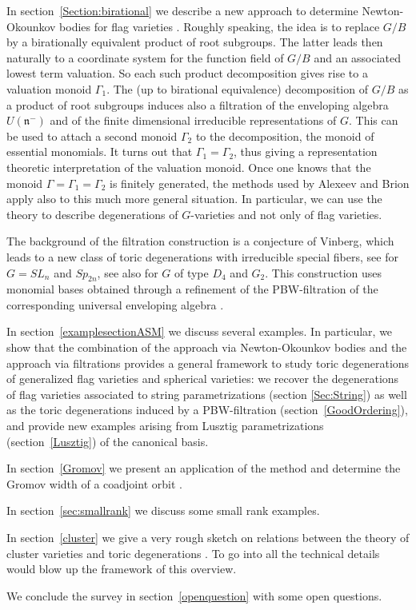 \documentclass{emsprocart}
\theoremstyle{definition}
\begin{document}
In section~\ref{Section:birational} we describe a new approach to determine  
Newton-Okounkov bodies for flag varieties \cite{FaFL}. Roughly speaking, the idea
is to replace $G/B$ by a birationally equivalent product of root subgroups.
The latter leads then naturally to a coordinate system for the function field of $G/B$
and an associated lowest term valuation. So each such product decomposition
gives rise to a valuation monoid $\Gamma_1$. The (up to birational equivalence) 
decomposition of $G/B$ as a product of root subgroups induces also a filtration
of the enveloping algebra $U(\mathfrak n^-)$ and of the finite dimensional irreducible representations
of $G$. This can be used to attach a second monoid $\Gamma_2$ to the decomposition, 
the monoid of essential monomials. It turns out that $\Gamma_1=\Gamma_2$, thus giving a representation theoretic 
interpretation of the valuation monoid. Once one knows that the monoid $\Gamma=\Gamma_1=\Gamma_2$
is finitely generated, the methods used by Alexeev and Brion \cite{AB} apply also to this much more general situation.
In particular, we can use the theory to describe degenerations of $G$-varieties and not only of flag varieties.

The background of the filtration construction is 
a conjecture of Vinberg, which leads to a new class of toric degenerations with irreducible special fibers,
see \cite{FFL1} for $G=SL_n$ and $Sp_{2n}$, see also \cite{G,G2} for $G$ of type $D_4$ and $G_2$.
This construction uses monomial bases obtained through a refinement of the PBW-filtration of the corresponding universal 
enveloping algebra \cite{FFL2,FFL3}.

In section~\ref{examplesectionASM} we discuss several examples. In particular, we show that the  combination of 
the approach via Newton-Okounkov bodies and the approach via filtrations provides a general framework to study toric degenerations of 
generalized flag varieties and spherical varieties: we recover the degenerations of flag varieties associated to string parametrizations
(section \ref{Sec:String}) as well as the toric degenerations induced by a PBW-filtration (section~\ref{GoodOrdering}),
and provide new examples arising from Lusztig parametrizations (section~\ref{Lusztig}) of the canonical basis. 

In section~\ref{Gromov} we present an application of the method and determine the Gromov width 
of a coadjoint orbit \cite{FLP}. 

In section~\ref{sec:smallrank} we discuss some small rank examples.
\par
In section~\ref{cluster} we give a very rough sketch on relations between the theory
of cluster varieties and toric degenerations \cite{GHKK,M,RW}.
To go into all the technical details would blow up the framework of this overview.
\par
We conclude the survey in section~\ref{openquestion} with some open questions.
\end{document}
